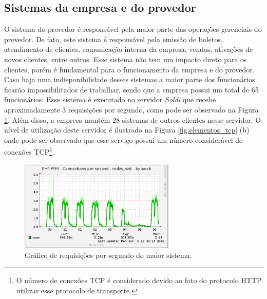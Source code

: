 \subsection{Sistemas da empresa e do provedor}
\label{section:sistemas}

O sistema do provedor é responsável pela maior parte das operações gerenciais do provedor. De fato, este sistema é responsável pela emissão de 
boletos, atendimento de clientes, comunicação interna da empresa, vendas, ativações de novos clientes, entre outros. Esse sistema não tem um 
impacto direto para os clientes, porém é fundamental para o funcionamento da empresa e do provedor. Caso haja uma indisponibilidade desses sistemas 
a maior parte dos funcionários ficarão impossibilitados de trabalhar, sendo que a empresa possui um total de 65 funcionários.
Esse sistema é executado no servidor \textit{Soldi} que recebe aproximadamente 3 requisições  \cite{tanenbaum2011} por segundo, como 
pode ser observado na Figura \ref{fig:soldi_week}. Além disso, a empresa mantém 28 sistemas de outros clientes nesse servidor. 
O nível de utilização deste servidor é ilustrado na Figura \ref{fig:elementos_tcp} (b) onde pode ser observado que esse serviço possui um número 
considerável de conexões \ac{TCP}\footnote[1]{O número de conexões \ac{TCP} é considerado devido ao fato do protocolo \ac{HTTP} utilizar esse 
protocolo de transporte.}.


\begin{figure}[h!]
 \centering
 \includegraphics[width=280px]{img/soldi_week.eps}
 \caption{Gráfico de requisições por segundo do maior sistema.}
 \label{fig:soldi_week}
\end{figure}

